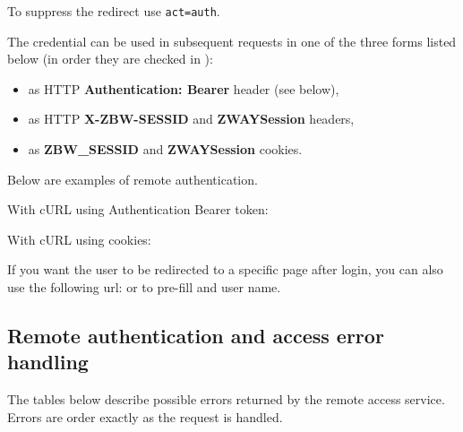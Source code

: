 To suppress the redirect use \texttt{act=auth}.

The credential can be used in subsequent requests in one of the three forms listed below (in order they are checked in \zway):
\begin{itemize}
\item as HTTP \textbf{Authentication: Bearer} header (see below),
\item as HTTP \textbf{X-ZBW-SESSID} and \textbf{ZWAYSession} headers,
\item as \textbf{ZBW\_SESSID} and \textbf{ZWAYSession} cookies.
\end{itemize}

Below are examples of remote authentication.

With cURL using Authentication Bearer token:
{\scriptsize
\begin{quote} 
\end{quote}
}

With cURL using cookies:
{\scriptsize
\begin{quote} 
\end{quote}
}


If you want the user to be redirected to a specific page after login, you can also use the following url:  or  to pre-fill \zwaydeviceid and user name.

\subsection{Remote authentication and access error handling}
\label{cap:authentication_remote_errors}

The tables below describe possible errors returned by the remote access service. Errors are order exactly as the request is handled.

